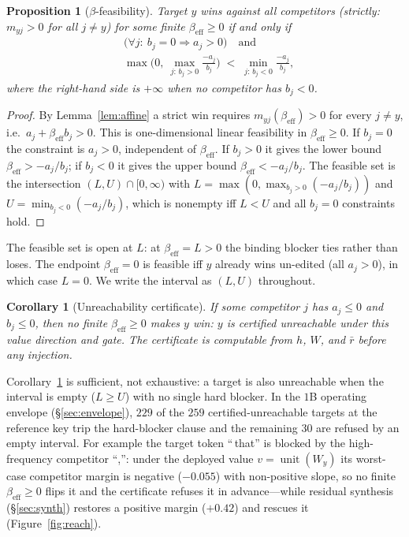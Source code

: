 \documentclass[10pt,twocolumn]{article}
\newtheorem{proposition}{Proposition}
\newtheorem{corollary}{Corollary}
\theoremstyle{remark}
\DeclareMathOperator{\unit}{unit}
\begin{document}
\begin{proposition}[$\beta$-feasibility]
\label{prop:reach}
Target $y$ wins against all competitors (strictly: $m_{yj}>0$ for all $j\ne y$)
for some finite
$\beta_{\mathrm{eff}}\ge 0$ if and only if
\[
\begin{aligned}
&\big(\forall j:\ b_j=0 \Rightarrow a_j>0\big)\quad\text{and}\\
&\max\!\Big(0,\ \max_{j:\,b_j>0}\tfrac{-a_j}{b_j}\Big)
\;<\;
\min_{j:\,b_j<0}\tfrac{-a_j}{b_j},
\end{aligned}
\]
where the right-hand side is $+\infty$ when no competitor has $b_j<0$.
\end{proposition}
\begin{proof}
By Lemma~\ref{lem:affine} a strict win requires $m_{yj}(\beta_{\mathrm{eff}})>0$
for every $j\ne y$, i.e.\ $a_j+\beta_{\mathrm{eff}}b_j>0$. This is one-dimensional
linear feasibility in $\beta_{\mathrm{eff}}\ge 0$. If $b_j=0$ the constraint is
$a_j>0$, independent of $\beta_{\mathrm{eff}}$. If $b_j>0$ it gives the lower bound
$\beta_{\mathrm{eff}}>-a_j/b_j$; if $b_j<0$ it gives the upper bound
$\beta_{\mathrm{eff}}<-a_j/b_j$. The feasible set is the intersection
$(L,U)\cap[0,\infty)$ with $L=\max(0,\max_{b_j>0}(-a_j/b_j))$ and
$U=\min_{b_j<0}(-a_j/b_j)$, which is nonempty iff $L<U$ and all $b_j=0$
constraints hold.
\end{proof}
\noindent The feasible set is open at $L$: at $\beta_{\mathrm{eff}}=L>0$ the
binding blocker ties rather than loses. The endpoint $\beta_{\mathrm{eff}}=0$ is
feasible iff $y$ already wins un-edited (all $a_j>0$), in which case $L=0$. We
write the interval as $(L,U)$ throughout.

\begin{corollary}[Unreachability certificate]
\label{cor:unflip}
If some competitor $j$ has $a_j\le 0$ and $b_j\le 0$, then no finite
$\beta_{\mathrm{eff}}\ge 0$ makes $y$ win: $y$ is certified unreachable under this
value direction and gate. The certificate is computable from $h$, $W$, and
$\bar r$ before any injection.
\end{corollary}
\noindent Corollary~\ref{cor:unflip} is sufficient, not exhaustive: a target is
also unreachable when the interval is empty ($L\ge U$) with no single hard
blocker. In the $1$B operating envelope (\S\ref{sec:envelope}), $229$ of the
$259$ certified-unreachable targets at the reference key trip the hard-blocker
clause and the remaining $30$ are refused by an empty interval. For example the target
token ``\,that'' is blocked by the high-frequency competitor ``,'': under the deployed
value $v=\unit(W_y)$ its worst-case competitor margin is negative ($-0.055$) with
non-positive slope, so no finite $\beta_{\mathrm{eff}}\ge0$ flips it and the certificate
refuses it in advance---while residual synthesis (\S\ref{sec:synth}) restores a positive
margin ($+0.42$) and rescues it (Figure~\ref{fig:reach}).
\end{document}
